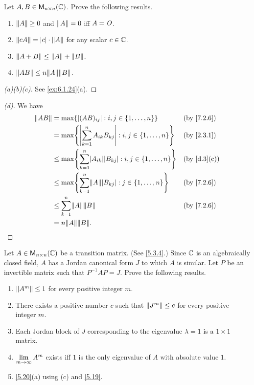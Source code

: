 \begin{ex}\label{ex:7.2.20}
  Let \(A, B \in \ms[n][n][\C]\).
  Prove the following results.
  \begin{enumerate}
    \item \(\left\lVert A\right\rVert \geq 0\) and \(\left\lVert A\right\rVert = 0\) iff \(A = \mathit{O}\).
    \item \(\left\lVert cA\right\rVert = \left\lvert c\right\rvert \cdot \left\lVert A\right\rVert\) for any scalar \(c \in \mathbb{C}\).
    \item \(\left\lVert A + B\right\rVert \leq \left\lVert A\right\rVert + \left\lVert B\right\rVert\).
    \item \(\norm{AB} \leq n \norm{A} \norm{B}\).
  \end{enumerate}
\end{ex}

\begin{proof}[(a)(b)(c)]
  See \cref{ex:6.1.24}(a).
\end{proof}

\begin{proof}[(d)]
  We have
  \begin{align*}
    \norm{AB} & = \max \set{\abs{(AB)_{i j}} : i, j \in \set{1, \dots, n}}                              &  & \by{7.2.6}  \\
              & = \max \set{\abs{\sum_{k = 1}^n A_{i k} B_{k j}} : i, j \in \set{1, \dots, n}}          &  & \by{2.3.1}  \\
              & \leq \max \set{\sum_{k = 1}^n \abs{A_{i k}} \abs{B_{k j}} : i, j \in \set{1, \dots, n}} &  & \by{d.3}[c] \\
              & \leq \max \set{\sum_{k = 1}^n \norm{A} \abs{B_{k j}} : j \in \set{1, \dots, n}}         &  & \by{7.2.6}  \\
              & \leq \sum_{k = 1}^n \norm{A} \norm{B}                                                   &  & \by{7.2.6}  \\
              & = n \norm{A} \norm{B}.
  \end{align*}
\end{proof}

\begin{ex}\label{ex:7.2.21}
  Let \(A \in \ms[n][n][\C]\) be a transition matrix.
  (See \cref{5.3.4}.)
  Since \(\mathbb{C}\) is an algebraically closed field, \(A\) has a Jordan canonical form \(J\) to which \(A\) is similar.
  Let \(P\) be an invertible matrix such that \(P^{-1} A P = J\).
  Prove the following results.
  \begin{enumerate}
    \item \(\left\lVert A^m\right\rVert \leq 1\) for every positive integer \(m\).
    \item There exists a positive number \(c\) such that \(\left\lVert J^m\right\rVert \leq c\) for every positive integer \(m\).
    \item Each Jordan block of \(J\) corresponding to the eigenvalue \(\lambda = 1\) is a \(1 \times 1\) matrix.
    \item \(\lim\limits_{m \to \infty} A^m\) exists iff \(1\) is the only eigenvalue of \(A\) with absolute value \(1\).
    \item \cref{5.20}(a) using (c) and \cref{5.19}.
  \end{enumerate}
\end{ex}

